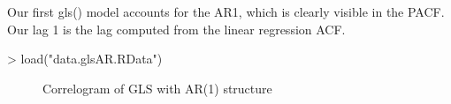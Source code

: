 \documentclass[10pt, a4paper]{article} %
\begin{document}
Our first gls() model accounts for the AR1, which is clearly visible in the PACF. 
Our lag 1 is the lag computed from the linear regression ACF.

\begin{Schunk}
\end{Schunk}

\begin{Schunk}
\begin{Sinput}
> load("data.glsAR.RData")
\end{Sinput}
\end{Schunk}


\begin{figure}[ht]
\begin{center}
\qquad
{}
\end{center}
\caption{Correlogram of GLS  with AR(1) structure}
\label{corglsAR}
\end{figure}
\end{document}
